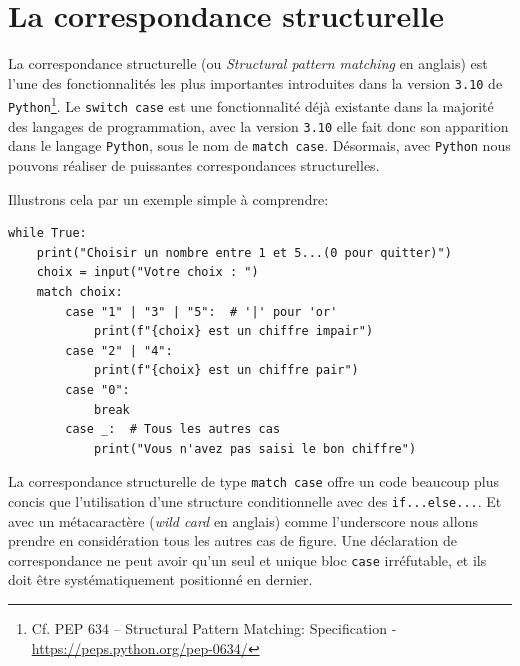 \documentclass[a4paper,11pt]{book}
\begin{document}
\section{La correspondance structurelle}\label{correspondance_structurelle}
La correspondance structurelle (ou \textit{Structural pattern matching} en anglais) est l'une des fonctionnalités les plus importantes introduites dans la version \texttt{3.10} de \texttt{Python}\footnote{Cf. PEP 634 – Structural Pattern Matching: Specification - \url{https://peps.python.org/pep-0634/}}. Le \texttt{switch case} est une fonctionnalité déjà existante dans la majorité des langages de programmation, avec la version \texttt{3.10} elle fait donc son apparition dans le langage \texttt{Python}, sous le nom de \texttt{match case}. Désormais, avec \texttt{Python} nous pouvons réaliser de puissantes correspondances structurelles.
\medskip

Illustrons cela par un exemple simple à comprendre:
\begin{lstlisting}
while True:
    print("Choisir un nombre entre 1 et 5...(0 pour quitter)")
    choix = input("Votre choix : ")
    match choix:
        case "1" | "3" | "5":  # '|' pour 'or'
            print(f"{choix} est un chiffre impair")
        case "2" | "4":
            print(f"{choix} est un chiffre pair")
        case "0":
            break
        case _:  # Tous les autres cas
            print("Vous n'avez pas saisi le bon chiffre")
\end{lstlisting}
\medskip

La correspondance structurelle de type \texttt{match case} offre un code beaucoup plus concis que l'utilisation d'une structure conditionnelle avec des \texttt{if...else...}. Et avec un métacaractère (\textit{wild card} en anglais) comme l'underscore nous allons prendre en considération tous les autres cas de figure. Une déclaration de correspondance ne peut avoir qu'un seul et unique bloc \texttt{case} irréfutable, et ils doit être systématiquement positionné en dernier.
\medskip
\end{document}
